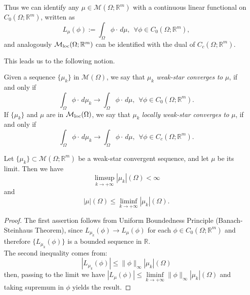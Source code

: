 Thus we can identify any $\mu \in \mathcal{M}(\Omega; \mathbb{R}^{m})$ with a continuous linear functional on $C_{0}(\Omega; \mathbb{R}^{m})$, written as
\[ L_{\mu}(\phi) := \int_{\Omega} \phi \cdot \, d\mu, \      \     \forall \phi \in C_{0}(\Omega; \mathbb{R}^{m}),   \]
and analogously $\mathcal{M}_{\rm loc}(\Omega; \mathbb{R}^{m})$ can be identified with the dual of $C_{c}(\Omega; \mathbb{R}^{m})$.

This leads us to the following notion.

\begin{definition} Given a sequence $\{\mu_{k}\}$ in $\mathcal{M}(\Omega)$, we say that $\mu_{k}$ {\em weak-star converges to} $\mu$, if and only if
\[ \int_{\Omega} \phi \cdot \, d\mu_{k} \to \int_{\Omega} \phi \cdot \, d\mu, \    \   \forall \phi \in C_{0}(\Omega; \mathbb{R}^{m}).   \]
If $\{\mu_{k}\}$ and $\mu$ are in $\mathcal{M}_{\rm loc}(\Omega)$, we say that $\mu_{k}$ {\em locally weak-star converges to} $\mu$, if and only if
\[ \int_{\Omega} \phi \cdot \, d\mu_{k} \to \int_{\Omega} \phi \cdot \, d\mu, \    \   \forall \phi \in C_{c}(\Omega; \mathbb{R}^{m}).   \]
\end{definition}

\begin{lemma} \label{weaktopology} Let $\{ \mu_{k} \} \subset \mathcal{M}(\Omega; \mathbb{R}^{m})$ be a weak-star convergent sequence, and let $\mu$ be its limit. Then we have
\[ \limsup\limits_{k \to +\infty} |\mu_{k}|(\Omega) < \infty \]
and
\[ |\mu|(\Omega) \le \liminf\limits_{k \to +\infty} |\mu_{k}|(\Omega). \]
\end{lemma}
\begin{proof}
The first assertion follows from Uniform Boundedness Principle (Banach-Steinhaus Theorem), since $L_{\mu_{k}}(\phi) \to L_{\mu}(\phi)$ for each $\phi \in C_{0}(\Omega; \mathbb{R}^{m})$ and therefore $\{ L_{\mu_{k}}(\phi) \}$ is a bounded sequence in $\mathbb{R}$. 
\\
The second inequality comes from:
\[ |L_{\mu_{k}}(\phi)| \le \|\phi\|_{\infty} |\mu_{k}|(\Omega) \]
then, passing to the limit we have $|L_{\mu}(\phi)| \le \liminf\limits_{k \to +\infty} \|\phi\|_{\infty} |\mu_{k}|(\Omega)$ and taking supremum in $\phi$ yields the result. 
\end{proof}

